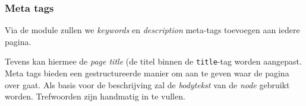 \subsubsection{Meta tags}\label{nodewords}
Via de  module zullen we \textit{keywords} en \textit{description} meta-tags toevoegen aan iedere pagina. 

Tevens kan hiermee de \emph{page title} (de titel binnen de \texttt{title}-tag worden aangepast. Meta tags bieden een gestructureerde manier om aan te geven waar de pagina over gaat. Als basis voor de beschrijving zal de \textit{bodytekst} van de \textit{node} gebruikt worden. Trefwoorden zijn handmatig in te vullen.